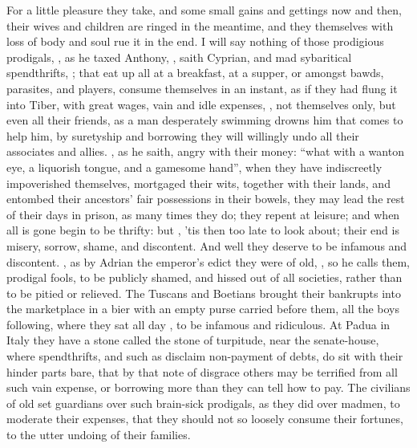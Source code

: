 For a little pleasure they take, and some small gains and gettings now and
then, their wives and children are ringed in the meantime, and they themselves
with loss of body and soul rue it in the end. I will say nothing of those
prodigious prodigals, , as he
taxed Anthony, , saith Cyprian, and mad
sybaritical spendthrifts, ; that eat
up all at a breakfast, at a supper, or amongst bawds, parasites, and players,
consume themselves in an instant, as if they had flung it into
Tiber, with great wages, vain and idle expenses, \etc{},
not themselves only, but even all their friends, as a man desperately swimming
drowns him that comes to help him, by suretyship and borrowing they will
willingly undo all their associates and allies. , as he saith, angry with their money: \enquote{what with
a wanton eye, a liquorish tongue, and a gamesome hand}, when they have
indiscreetly impoverished themselves, mortgaged their wits, together with their
lands, and entombed their ancestors' fair possessions in their bowels, they may
lead the rest of their days in prison, as many times they do; they repent at
leisure; and when all is gone begin to be thrifty: but , 'tis then too late to look about; their end
is misery, sorrow, shame, and discontent. And well they deserve to be infamous
and discontent. , as by
Adrian the emperor's edict they were of old, , so
he calls them, prodigal fools, to be publicly shamed, and hissed out of all
societies, rather than to be pitied or relieved. The
Tuscans and Boetians brought their bankrupts into the marketplace in a bier
with an empty purse carried before them, all the boys following, where they sat
all day , to be infamous and ridiculous. At
Padua in Italy they have a stone called the stone of
turpitude, near the senate-house, where spendthrifts, and such as disclaim
non-payment of debts, do sit with their hinder parts bare, that by that note of
disgrace others may be terrified from all such vain expense, or borrowing more
than they can tell how to pay. The civilians of old set
guardians over such brain-sick prodigals, as they did over madmen, to moderate
their expenses, that they should not so loosely consume their fortunes, to the
utter undoing of their families.


